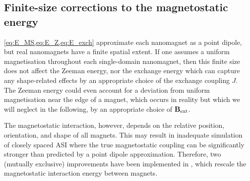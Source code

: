 \subsection{Finite-size corrections to the magnetostatic energy}
\cref{eq:E_MS,eq:E_Z,eq:E_exch} approximate each nanomagnet as a point dipole, but real nanomagnets have a finite spatial extent.
If one assumes a uniform magnetisation throughout each single-domain nanomagnet, then this finite size does not affect the Zeeman energy, nor the exchange energy which can capture any shape-related effects by an appropriate choice of the exchange coupling $J$.
The Zeeman energy could even account for a deviation from uniform magnetisation near the edge of a magnet, which occurs in reality but which we will neglect in the following, by an appropriate choice of $\boldsymbol{\mathbf{B}}_\mathrm{ext}$. \par
The magnetostatic interaction, however, depends on the relative position, orientation, and shape of all magnets.
This may result in inadequate simulation of closely spaced ASI where the true magnetostatic coupling can be significantly stronger than predicted by a point dipole approximation.
Therefore, two (mutually exclusive) improvements have been implemented in \hotspice, which rescale the magnetostatic interaction energy between magnets.

